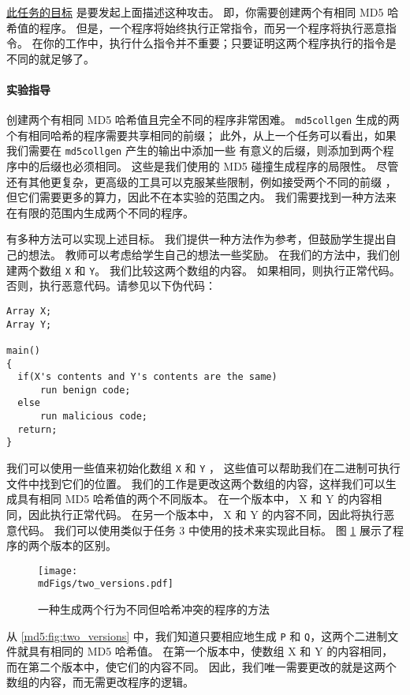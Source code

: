 \underline{此任务的目标} 是要发起上面描述这种攻击。
即，你需要创建两个有相同 MD5 哈希值的程序。
但是，一个程序将始终执行正常指令，而另一个程序将执行恶意指令。
在你的工作中，执行什么指令并不重要；只要证明这两个程序执行的指令是不同的就足够了。



\paragraph{实验指导}
创建两个有相同 MD5 哈希值且完全不同的程序非常困难。
\texttt{md5collgen} 生成的两个有相同哈希的程序需要共享相同的前缀；
此外，从上一个任务可以看出，如果我们需要在 \texttt{md5collgen} 产生的输出中添加一些
有意义的后缀，则添加到两个程序中的后缀也必须相同。
这些是我们使用的 MD5 碰撞生成程序的局限性。
尽管还有其他更复杂，更高级的工具可以克服某些限制，例如接受两个不同的前缀 \cite{stevens2007}，
但它们需要更多的算力，因此不在本实验的范围之内。
我们需要找到一种方法来在有限的范围内生成两个不同的程序。

有多种方法可以实现上述目标。
我们提供一种方法作为参考，但鼓励学生提出自己的想法。
教师可以考虑给学生自己的想法一些奖励。
在我们的方法中，我们创建两个数组 \texttt{X} 和 \texttt{Y}。
我们比较这两个数组的内容。
如果相同，则执行正常代码。
否则，执行恶意代码。请参见以下伪代码：


\begin{lstlisting}
Array X;
Array Y;

main()
{
  if(X's contents and Y's contents are the same)
      run benign code;
  else
      run malicious code;
  return;
}
\end{lstlisting}


我们可以使用一些值来初始化数组 \texttt{X} 和 \texttt{Y} ，
这些值可以帮助我们在二进制可执行文件中找到它们的位置。
我们的工作是更改这两个数组的内容，这样我们可以生成具有相同 MD5 哈希值的两个不同版本。
在一个版本中， X 和 Y 的内容相同，因此执行正常代码。
在另一个版本中， X 和 Y 的内容不同，因此将执行恶意代码。
我们可以使用类似于任务 3 中使用的技术来实现此目标。
图 \ref{md5:fig:two_versions} 展示了程序的两个版本的区别。

\begin{figure}[htb]
	\centering
	\texttt{[image: \\mdFigs/two\_versions.pdf]}
	\caption{一种生成两个行为不同但哈希冲突的程序的方法}
	\label{md5:fig:two_versions}
\end{figure}

从 \autoref{md5:fig:two_versions} 中，我们知道只要相应地生成 \texttt{P} 和
\texttt{Q}，这两个二进制文件就具有相同的 MD5 哈希值。
在第一个版本中，使数组 X 和 Y 的内容相同，而在第二个版本中，使它们的内容不同。
因此，我们唯一需要更改的就是这两个数组的内容，而无需更改程序的逻辑。


